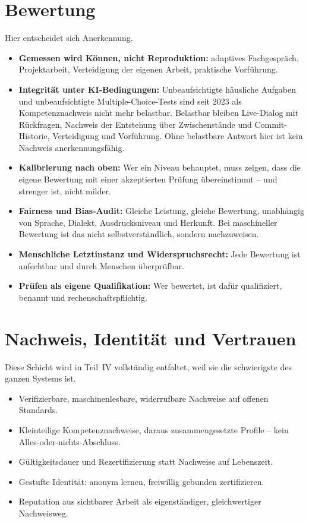 \documentclass[11pt,a4paper]{article}
\begin{document}
\section{Bewertung}
Hier entscheidet sich Anerkennung.
\begin{itemize}[label=--]
    \item \textbf{Gemessen wird Können, nicht Reproduktion:} adaptives Fachgespräch, Projektarbeit, Verteidigung der eigenen Arbeit, praktische Vorführung.
    \item \textbf{Integrität unter KI-Bedingungen:} Unbeaufsichtigte häusliche Aufgaben und unbeaufsichtigte Multiple-Choice-Tests sind seit 2023 als Kompetenznachweis nicht mehr belastbar. Belastbar bleiben Live-Dialog mit Rückfragen, Nachweis der Entstehung über Zwischenstände und Commit-Historie, Verteidigung und Vorführung. Ohne belastbare Antwort hier ist kein Nachweis anerkennungsfähig.
    \item \textbf{Kalibrierung nach oben:} Wer ein Niveau behauptet, muss zeigen, dass die eigene Bewertung mit einer akzeptierten Prüfung übereinstimmt -- und strenger ist, nicht milder.
    \item \textbf{Fairness und Bias-Audit:} Gleiche Leistung, gleiche Bewertung, unabhängig von Sprache, Dialekt, Ausdrucksniveau und Herkunft. Bei maschineller Bewertung ist das nicht selbstverständlich, sondern nachzuweisen.
    \item \textbf{Menschliche Letztinstanz und Widerspruchsrecht:} Jede Bewertung ist anfechtbar und durch Menschen überprüfbar.
    \item \textbf{Prüfen als eigene Qualifikation:} Wer bewertet, ist dafür qualifiziert, benannt und rechenschaftspflichtig.
\end{itemize}

\section{Nachweis, Identität und Vertrauen}
Diese Schicht wird in Teil~IV vollständig entfaltet, weil sie die schwierigste des ganzen Systems ist.
\begin{itemize}[label=--]
    \item Verifizierbare, maschinenlesbare, widerrufbare Nachweise auf offenen Standards.
    \item Kleinteilige Kompetenznachweise, daraus zusammengesetzte Profile -- kein Alles-oder-nichts-Abschluss.
    \item Gültigkeitsdauer und Rezertifizierung statt Nachweise auf Lebenszeit.
    \item Gestufte Identität: anonym lernen, freiwillig gebunden zertifizieren.
    \item Reputation aus sichtbarer Arbeit als eigenständiger, gleichwertiger Nachweisweg.
\end{itemize}
\end{document}
